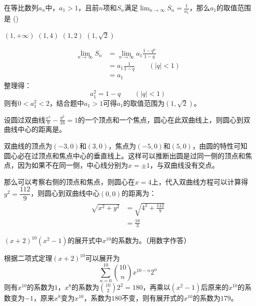 \documentclass[answers]{exam}
\begin{document}
\begin{questions}
	\question 在等比数列${a_n}$中，$a_1>1$，且前$n$项和$S_n$满足$\displaystyle
		\lim_{n\to\infty}S_n=\frac{1}{a_1}$，那么$a_1$的取值范围是 \hfill (\hspace{1cm})

	\begin{oneparchoices}
		\choice $(1,+\infty)$
		\choice $(1,4)$
		\choice $(1,2)$
		\CorrectChoice $(1,\sqrt{2})$
	\end{oneparchoices}

	\begin{solution}
		\begin{align*}
			\lim_{n\to\infty}S_n & = \lim_{n\to\infty}a_1\frac{1-q^n}{1-q} \\
			                     & = a_1\frac{1}{1-q}\qquad (|q|< 1)       \\
			                     & = a_1
		\end{align*}
		整理得：
		\begin{equation*}
			a_1^2 = 1 - q \qquad (|q|<1)
		\end{equation*}
		则有$0<a_1^2<2$，结合题中$a_1>1$可得$a_1$的取值范围为$(1,\sqrt{2})$。
	\end{solution}

	\question 设圆过双曲线$\frac{x^2}{9} -
		\frac{y^2}{16}=1$的一个顶点和一个焦点，圆心在此双曲线上，则圆心到双曲线中心的距离是\underline{\hspace{2cm}}。

	\begin{solution}
		双曲线的顶点为$(-3,0)$和$(3,0)$，焦点为$(-5,0)$和$(5,0)$，由圆的特性可知圆心必在过顶点和焦点中心的垂直线上。这样可以推断出圆是过同一侧的顶点和焦点，因为如果不在同一侧，中心线分别为$x=\pm1$，与双曲线没有交点。

		那么可以考察右侧的顶点和焦点，则圆心在$x=4$上，代入双曲线方程可以计算得$y^2=\dfrac{112}{9}$，则圆心到双曲线中心$(0,0)$的距离为：
		\begin{align*}
			\sqrt{x^2 + y^2} & = \sqrt{4^2 + \frac{112}{9}} \\
			                 & = \frac{16}{3}
		\end{align*}
	\end{solution}

	\question $(x+2)^{10}(x^2-1)$的展开式中$x^{10}$的系数为\fillin[179][2cm]。（用数字作答）

	\begin{solution}
		根据二项式定理$(x+2)^{10}$可以展开为
		\begin{equation*}
			\sum_{n=0}^{10}\binom{10}{n}x^{10-n}2^{n}
		\end{equation*}
		则有$x^10$的系数为$1$，$x^8$的系数为$\binom{10}{2}2^2 =
			180$，再乘以$(x^2-1)$后原来的$x^{10}$的系数变为$-1$，原来$x^8$变为$x^{10}$，系数为$180$不变，则有展开式的$x^{10}$的系数为$179$。
	\end{solution}


\end{questions}
\end{document}
